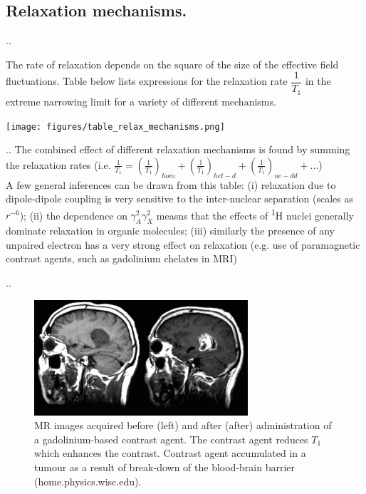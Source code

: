 \documentclass[handout]{beamer}
\begin{document}
\subsection{Relaxation mechanisms.}
\begin{frame}{\thesection.\thesubsection. \insertsubsection}
	\begin{minipage}{0.4\textwidth}
		The rate of relaxation depends on the square of the size of the effective field fluctuations. Table below lists expressions for the relaxation rate $\dfrac{1}{T_1}$ in the extreme narrowing limit for a variety of different mechanisms.
	\end{minipage}
	\hspace{0.1cm}
    \begin{minipage}{0.55\textwidth}
	 		\centering
	 		\texttt{[image: figures/table\_relax\_mechanisms.png]}	 		
    \end{minipage}

\end{frame}

\begin{frame}{\thesection.\thesubsection. \insertsubsection}
   The combined effect of different relaxation mechanisms is found by summing the relaxation rates (i.e. $\frac{1}{T_1} = (\frac{1}{T_1})_{hom} + (\frac{1}{T_1})_{het-d} + (\frac{1}{T_1})_{ue-dd} + ...$)\\
   A few general inferences can be drawn from this table: (i) relaxation due to dipole-dipole coupling is very sensitive to the inter-nuclear separation (scales as $r^{-6}$); (ii) the dependence on $\gamma_A^2 \gamma_X^2$ measns that the effects of \textsuperscript{1}H nuclei generally dominate relaxation in organic molecules; (iii) similarly the presence of any unpaired electron has a very strong effect on relaxation (e.g. use of paramagnetic contrast agents, such as gadolinium chelates in MRI)
\end{frame}

\begin{frame}{\thesection.\thesubsection. \insertsubsection}
   \begin{figure}
   	  \centering
   	  \includegraphics[scale=0.9]{figures/contrast_MRI_Gd.png}
   	  \caption{MR images acquired before (left) and
   	  	after (after) administration of a gadolinium-based
   	  	contrast agent. The contrast agent
   	  	reduces $T_1$ which enhances the contrast.
   	  	Contrast agent accumulated in a tumour as a
   	  	result of break-down of the blood-brain
   	  	barrier (home.physics.wisc.edu).}
   \end{figure}
\end{frame}
\end{document}
